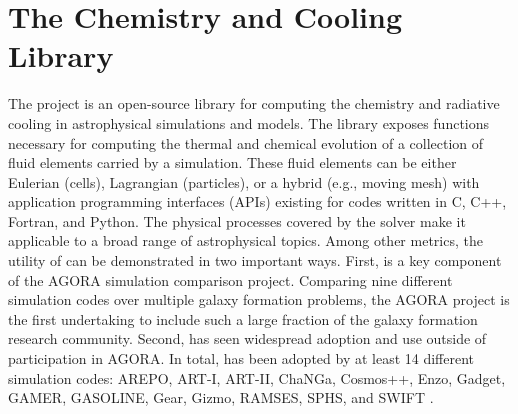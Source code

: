 \section{The \grackle{} Chemistry and Cooling Library}

The \grackle{} project
\citep[][\url{https://grackle.readthedocs.io}]{2017MNRAS.466.2217S} is
an open-source library for computing the chemistry and radiative
cooling in astrophysical simulations and models.  The
\grackle{} library exposes functions necessary for computing the
thermal and chemical evolution of a collection of fluid elements carried by a
simulation.  These fluid elements can be either Eulerian (cells),
Lagrangian (particles), or a hybrid (e.g., moving mesh) with
application programming interfaces (APIs)
existing for codes written in C, C++, Fortran, and Python.  The
physical processes covered by the solver make it applicable to a broad
range of astrophysical topics.  Among
other metrics, the utility of \grackle{} can be demonstrated in two
important ways.  First, \grackle{} is a key component of the AGORA
\citep{2014ApJS..210...14K, 2016ApJ...833..202K} simulation comparison
project.  Comparing nine different simulation codes over multiple
galaxy formation problems, the AGORA project is the first
undertaking to include such a large fraction of the galaxy formation research
community.
Second, \grackle{} has
seen widespread adoption and use outside of participation in AGORA.
In total, \grackle{} has been adopted by at least 14 different
simulation codes:
AREPO, ART-I, ART-II, ChaNGa, Cosmos++, Enzo, Gadget, GAMER, GASOLINE, Gear,
Gizmo, RAMSES, SPHS, and SWIFT
\citep{2010MNRAS.401..791S, 1999PhDT........25K, 2002ApJ...571..563K,
2008ApJ...672...19R, 2004NewA....9..137W, 2006MNRAS.373.1074S,
2003ApJS..147..177A, 2005ApJ...635..723A, 2014ApJS..211...19B,
2005MNRAS.364.1105S, 2010ApJS..186..457S, 2004NewA....9..137W,
2012A&A...538A..82R, 2012ASPC..453..141R, 2015MNRAS.450...53H,
2002A&A...385..337T, 2012MNRAS.422.3037R, 2013arXiv1309.3783G,
2016arXiv160602738S}.


